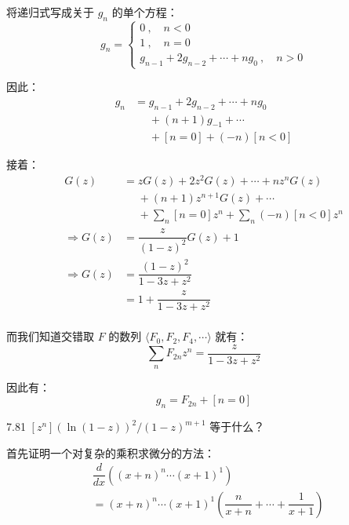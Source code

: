 将递归式写成关于 \( g_n \) 的单个方程：
\[
  g_n =
  \begin{cases}
    0 \ , \quad n < 0 \\
    1 \ , \quad n = 0 \\
    g_{n-1} + 2g_{n-2} + \cdots + ng_0 \ , \quad n > 0
  \end{cases}
\]

因此：
\begin{align*}
  g_n &= g_{n-1} + 2g_{n-2} + \cdots + ng_0 \\
  & \phantom{=} + (n+1)g_{-1} + \cdots \\
  & \phantom{=} + [n = 0] + (-n) [n < 0]
\end{align*}

接着：
\begin{align*}
  G(z) &= z G(z) + 2z^2 G(z) + \cdots + nz^n G(z) \\
  & \phantom{=} + (n+1)z^{n+1} G(z) + \cdots \\
  & \phantom{=} + \sum_n [n=0] z^n + \sum_n (-n)[n<0] z^n \\
  \Rightarrow
  G(z) &= \dfrac{z}{(1-z)^2} G(z) + 1 \\
  \Rightarrow
  G(z) &= \dfrac{(1-z)^2}{1-3z+z^2} \\
  &= 1 + \dfrac{z}{1-3z+z^2} \\
\end{align*}

而我们知道交错取 \( F \) 的数列 \( \langle F_0 , F_2 , F_4 , \cdots \rangle \) 就有：
\[
  \sum_n F_{2n} z^n = \dfrac{z}{1-3z+z^2}
\]

因此有：
\[
  g_n = F_{2n} + [n=0]
\]

\begin{problem}{7.8}{1}
  \( [z^n] (\ln{(1-z)})^2 / (1-z)^{m+1} \) 等于什么？
\end{problem}

首先证明一个对复杂的乘积求微分的方法：
\begin{align*}
  & \dfrac{d}{dx} \left( (x+n)^n \cdots (x+1)^1 \right) \\
  &= (x+n)^n \cdots (x+1)^1 \left( \dfrac{n}{x+n} + \cdots + \dfrac{1}{x+1} \right)
\end{align*}

